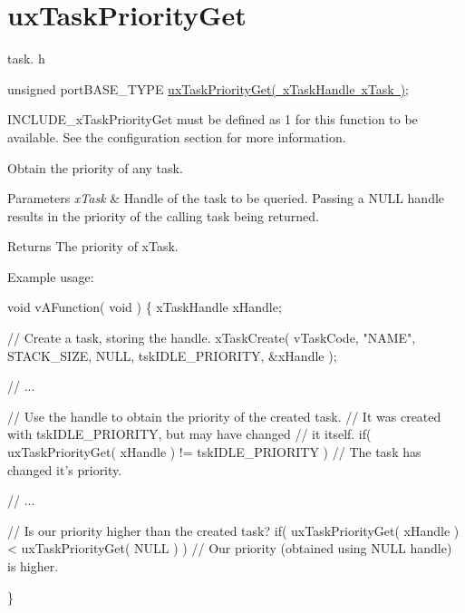 \hypertarget{group__ux_task_priority_get}{}\section{ux\+Task\+Priority\+Get}
\label{group__ux_task_priority_get}
task. h 
\begin{DoxyPre}unsigned portBASE\_TYPE \mbox{\hyperlink{task_8h_a764e3d93e7e20aa4f3926314fba11329}{uxTaskPriorityGet( xTaskHandle xTask )}};\end{DoxyPre}


I\+N\+C\+L\+U\+D\+E\+\_\+x\+Task\+Priority\+Get must be defined as 1 for this function to be available. See the configuration section for more information.

Obtain the priority of any task.


\begin{DoxyParams}{Parameters}
{\em x\+Task} & Handle of the task to be queried. Passing a N\+U\+LL handle results in the priority of the calling task being returned.\\
\hline
\end{DoxyParams}
\begin{DoxyReturn}{Returns}
The priority of x\+Task.
\end{DoxyReturn}
Example usage\+: 
\begin{DoxyPre}
void vAFunction( void )
\{
xTaskHandle xHandle;
\begin{DoxyVerb}// Create a task, storing the handle.
xTaskCreate( vTaskCode, "NAME", STACK_SIZE, NULL, tskIDLE_PRIORITY, &xHandle );

// ...

// Use the handle to obtain the priority of the created task.
// It was created with tskIDLE_PRIORITY, but may have changed
// it itself.
if( uxTaskPriorityGet( xHandle ) != tskIDLE_PRIORITY )
{
 // The task has changed it's priority.
}

// ...

// Is our priority higher than the created task?
if( uxTaskPriorityGet( xHandle ) < uxTaskPriorityGet( NULL ) )
{
 // Our priority (obtained using NULL handle) is higher.
}
\end{DoxyVerb}

\}
  \end{DoxyPre}
 